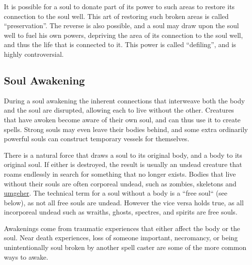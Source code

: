 It is possible for a soul to donate part of its power to such areas to restore
its connection to the soul well. This art of restoring such broken areas is
called ``preservation''. The reverse is also possible, and a soul may draw
upon the soul well to fuel his own powers, depriving the area of its connection
to the soul well, and thus the life that is connected to it. This power is
called ``defiling'', and is highly controversial.


\subsection{Soul Awakening}
\label{sec:Soul Awakening}

During a soul awakening the inherent connections that interweave both the 
body and the soul are disrupted, allowing each to live without the other.
Creatures that have awoken become aware of their own soul, and can thus use
it to create spells. Strong souls may even leave their bodies behind, and
some extra ordinarily powerful souls can construct temporary vessels for
themselves. 

There is a natural force that draws a soul to its original body, and a body 
to its original soul. If either is destroyed, the result is usually an 
undead creature that roams endlessly in search for something that no longer 
exists. Bodies that live without their souls are often corporeal undead, 
such as zombies, skeletons and \hyperref[sec:Umgeher]{umgeher}. The 
technical term for a soul without a body is a ``free soul`` (see below), as 
not all free souls are undead. However the vice versa holds true, as all 
incorporeal undead such as wraiths, ghosts, spectres, and spirits are free 
souls.

Awakenings come from traumatic experiences that either affect the body or the
soul. Near death experiences, loss of someone important, necromancy, or being
unintentionally soul broken by another spell caster are some of the more
common ways to awake.

